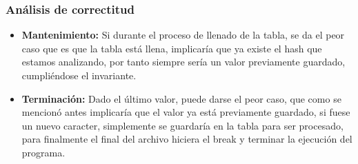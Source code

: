 \documentclass{beamer}
\begin{document}
	\begin{frame}
	\frametitle{Análisis de correctitud}
		\begin{itemize}
			\item \textbf{Mantenimiento:} Si durante el proceso de llenado de la tabla, se da el peor caso que es que la tabla está llena, implicaría que ya existe el hash que estamos analizando, por tanto siempre sería un valor previamente guardado, cumpliéndose el invariante.

			\item \textbf{Terminación:} Dado el último valor, puede darse el peor caso, que como se mencionó antes implicaría que el valor ya está previamente guardado, si fuese un nuevo caracter, simplemente se guardaría en la tabla para ser procesado, para finalmente el final del archivo hiciera el break y terminar la ejecución del programa.
		\end{itemize}			
	
	\end{frame}		
\end{document}
